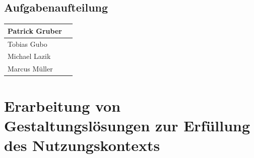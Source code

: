 \documentclass[12pt, a4paper]{scrartcl}
\begin{document}
	\subsection*{Aufgabenaufteilung}
	\begin{tabularx}{0.95\textwidth}{|l|X|}
		\hline
		Patrick Gruber & \\
		\hline
		Tobias Gubo & \\
		\hline
		Michael Lazik & \\
		\hline
		Marcus Müller & \\
		\hline
	\end{tabularx}
	
	\newpage
	
	\section{Erarbeitung von Gestaltungslösungen zur Erfüllung des Nutzungskontexts}
\end{document}
